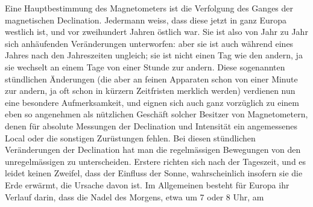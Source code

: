 Eine Hauptbestimmung des Magnetometers ist die Verfolgung des Ganges der magnetischen Declination. Jedermann weiss, dass diese jetzt in ganz Europa westlich ist, und vor zweihundert Jahren östlich war. Sie ist also von Jahr zu Jahr sich anhäufenden Veränderungen unterworfen: aber sie ist auch während eines Jahres nach den Jahreszeiten ungleich; sie ist nicht einen Tag wie den andern, ja sie wechselt an einem Tage von einer Stunde zur andern. Diese sogenannten stündlichen Änderungen (die aber an feinen Apparaten schon von einer Minute zur andern, ja oft schon in kürzern Zeitfristen merklich werden) verdienen nun eine besondere Aufmerksamkeit, und eignen sich auch ganz vorzüglich zu einem eben so angenehmen als nützlichen Geschäft solcher Besitzer von Magnetometern, denen für absolute Messungen der Declination und Intensität ein angemessenes Local oder die sonstigen Zurüstungen fehlen. Bei diesen stündlichen Veränderungen der Declination hat man die regelmässigen Bewegungen von den unregelmässigen zu unterscheiden. Erstere richten sich nach der Tageszeit, und es leidet keinen Zweifel, dass der Einfluss der Sonne, wahrscheinlich insofern sie die Erde erwärmt, die Ursache davon ist. Im Allgemeinen besteht für Europa ihr Verlauf darin, dass die Nadel des Morgens, etwa um 7 oder 8 Uhr, am
\par\clearpage
{}
